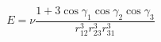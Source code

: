 \documentclass[12pt]{article}
\begin{document}
\begin{equation}
E=\nu\frac{1+3\cos\gamma_1\cos\gamma_2\cos\gamma_3}{r_{12}^3r_{23}^3r_{31}^3}
\end{equation}                           
\end{document}
